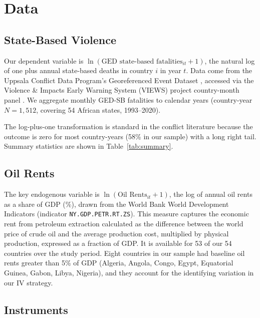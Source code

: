 \documentclass[12pt]{article}
\begin{document}
\section{Data}
\label{sec:data}

\subsection{State-Based Violence}

Our dependent variable is $\ln(\text{GED state-based fatalities}_{it}+1)$,
the natural log of one plus annual state-based deaths
in country $i$ in year $t$.
Data come from the Uppsala Conflict Data Program's Georeferenced Event Dataset
\citep[GED;][]{sundberg2013introducing},
accessed via the Violence \& Impacts Early Warning System
(VIEWS) project country-month panel \citep{hegre2019views}.
We aggregate monthly GED-SB fatalities to calendar years
(country-year $N = 1{,}512$, covering 54 African states, 1993--2020).

The log-plus-one transformation is standard in the conflict literature
because the outcome is zero for most country-years
(58\% in our sample) with a long right tail.
Summary statistics are shown in Table~\ref{tab:summary}.

\subsection{Oil Rents}

The key endogenous variable is $\ln(\text{Oil Rents}_{it}+1)$,
the log of annual oil rents as a share of GDP (\%),
drawn from the World Bank World Development Indicators
(indicator \texttt{NY.GDP.PETR.RT.ZS}).
This measure captures the economic rent from petroleum extraction
calculated as the difference between the world price of crude oil and
the average production cost, multiplied by physical production,
expressed as a fraction of GDP.
It is available for 53 of our 54 countries over the study period.
Eight countries in our sample had baseline oil rents greater than 5\% of GDP
(Algeria, Angola, Congo, Egypt, Equatorial Guinea, Gabon, Libya, Nigeria),
and they account for the identifying variation in our IV strategy.

\subsection{Instruments}
\end{document}
